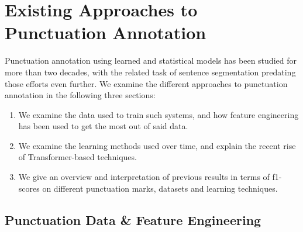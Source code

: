 \documentclass[bsc,deptreport,ai]{infthesis} %
\begin{document}
\section{Existing Approaches to Punctuation Annotation}
Punctuation annotation using learned and statistical models has been studied for more than two decades, with the related task of sentence segmentation predating those efforts even further. We examine the different approaches to punctuation annotation in the following three sections:
\begin{enumerate}
    \item We examine the data used to train such systems, and how feature engineering has been used to get the most out of said data.
    \item We examine the learning methods used over time, and explain the recent rise of Transformer-based techniques.
    \item We give an overview and interpretation of previous results in terms of f1-scores on different punctuation marks, datasets and learning techniques.
\end{enumerate}

\subsection{Punctuation Data \& Feature Engineering}
\label{sec:features}
\end{document}
